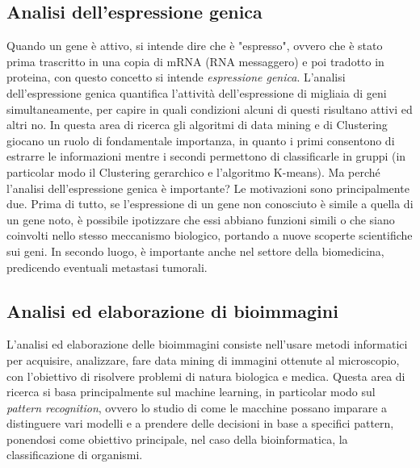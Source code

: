 \subsection{Analisi dell'espressione genica}
Quando un gene è attivo, si intende dire che è "espresso", ovvero che è stato prima trascritto in una copia di mRNA (RNA messaggero) e poi tradotto in proteina, con questo concetto si intende \textit{espressione genica}. L'analisi dell'espressione genica quantifica l'attività dell'espressione di migliaia di geni simultaneamente, per capire in quali condizioni alcuni di questi risultano attivi ed altri no.
\newline
In questa area di ricerca gli algoritmi di data mining e di Clustering giocano un ruolo di fondamentale importanza, in quanto i primi consentono di estrarre le informazioni mentre i secondi permettono di classificarle in gruppi (in particolar modo il Clustering gerarchico e l'algoritmo K-means).
\newline
Ma perché l'analisi dell'espressione genica è importante? Le motivazioni sono principalmente due. Prima di tutto, se l'espressione di un gene non conosciuto è simile a quella di un gene noto, è possibile ipotizzare che essi abbiano funzioni simili o che siano coinvolti nello stesso meccanismo biologico, portando a nuove scoperte scientifiche sui geni. In secondo luogo, è importante anche nel settore della biomedicina, predicendo eventuali metastasi tumorali.

\subsection{Analisi ed elaborazione di bioimmagini}
L'analisi ed elaborazione delle bioimmagini consiste nell'usare metodi informatici per acquisire, analizzare, fare data mining di immagini ottenute al microscopio, con l'obiettivo di risolvere problemi di natura biologica e medica.
Questa area di ricerca si basa principalmente sul machine learning, in particolar modo sul \textit{pattern recognition}, ovvero lo studio di come le macchine possano imparare a distinguere vari modelli e a prendere delle decisioni in base a specifici pattern, ponendosi come obiettivo principale, nel caso della bioinformatica, la classificazione di organismi.

